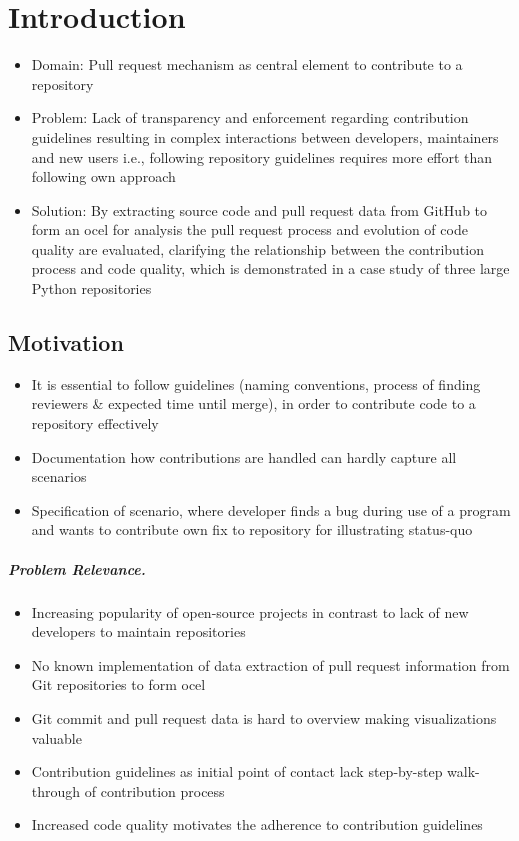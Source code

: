 \chapter{Introduction}
\label{chap:intro}

\begin{itemize}
	\item Domain: Pull request mechanism as central element to contribute to a repository \autocite{DBLP:conf/icse/TsayDH14}
	\item Problem: Lack of transparency and enforcement regarding contribution guidelines resulting in complex interactions between developers, maintainers and new users i.e., following repository guidelines requires more effort than following own approach
	\item Solution: By extracting source code and pull request data from GitHub to form an \ac{ocel} for analysis the pull request process and evolution of code quality are evaluated, clarifying the relationship between the contribution process and code quality, which is demonstrated in a case study of three large Python repositories

\end{itemize}

\section{Motivation}
\label{sec:intro_ssec:motiv}
\begin{itemize}
	\item It is essential to follow guidelines (naming conventions, process of finding reviewers \& expected time until merge), in order to contribute code to a repository effectively
	\item Documentation how contributions are handled can hardly capture all scenarios
	\item Specification of scenario, where developer finds a bug during use of a program and wants to contribute own fix to repository for illustrating status-quo
\end{itemize}
\paragraph{Problem Relevance.} 
\begin{itemize}
	\item Increasing popularity of open-source projects in contrast to lack of new developers to maintain repositories \autocite{DBLP:journals/corr/abs-2208-04895}\autocite{DBLP:journals/ese/RehmanWKIM22}
	\item No known implementation of data extraction of pull request information from Git repositories to form \ac{ocel}
	\item Git commit and pull request data is hard to overview making visualizations valuable
	\item Contribution guidelines as initial point of contact \autocite{DBLP:conf/icsm/ElazharySEZ19} lack step-by-step walk-through of contribution process
	\item Increased code quality motivates the adherence to contribution guidelines
\end{itemize}


